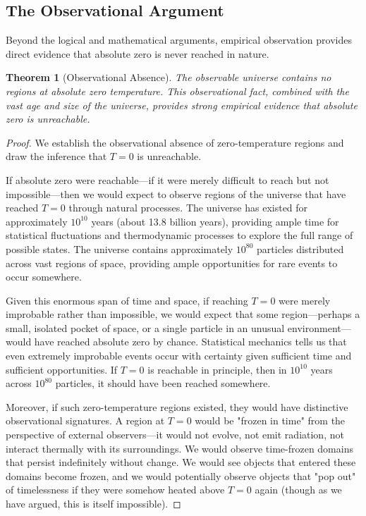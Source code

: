 \documentclass[12pt,a4paper]{article}
\newtheorem{theorem}{Theorem}[section]
\theoremstyle{definition}
\theoremstyle{remark}
\begin{document}
\subsection{The Observational Argument}

Beyond the logical and mathematical arguments, empirical observation provides direct evidence that absolute zero is never reached in nature.

\begin{theorem}[Observational Absence]
\label{thm:observational_absence}
The observable universe contains no regions at absolute zero temperature. This observational fact, combined with the vast age and size of the universe, provides strong empirical evidence that absolute zero is unreachable.
\end{theorem}

\begin{proof}
We establish the observational absence of zero-temperature regions and draw the inference that $T = 0$ is unreachable.

If absolute zero were reachable—if it were merely difficult to reach but not impossible—then we would expect to observe regions of the universe that have reached $T = 0$ through natural processes. The universe has existed for approximately $10^{10}$ years (about 13.8 billion years), providing ample time for statistical fluctuations and thermodynamic processes to explore the full range of possible states. The universe contains approximately $10^{80}$ particles distributed across vast regions of space, providing ample opportunities for rare events to occur somewhere.

Given this enormous span of time and space, if reaching $T = 0$ were merely improbable rather than impossible, we would expect that some region—perhaps a small, isolated pocket of space, or a single particle in an unusual environment—would have reached absolute zero by chance. Statistical mechanics tells us that even extremely improbable events occur with certainty given sufficient time and sufficient opportunities. If $T = 0$ is reachable in principle, then in $10^{10}$ years across $10^{80}$ particles, it should have been reached somewhere.

Moreover, if such zero-temperature regions existed, they would have distinctive observational signatures. A region at $T = 0$ would be "frozen in time" from the perspective of external observers—it would not evolve, not emit radiation, not interact thermally with its surroundings. We would observe time-frozen domains that persist indefinitely without change. We would see objects that entered these domains become frozen, and we would potentially observe objects that "pop out" of timelessness if they were somehow heated above $T = 0$ again (though as we have argued, this is itself impossible).


\end{proof}
\end{document}
